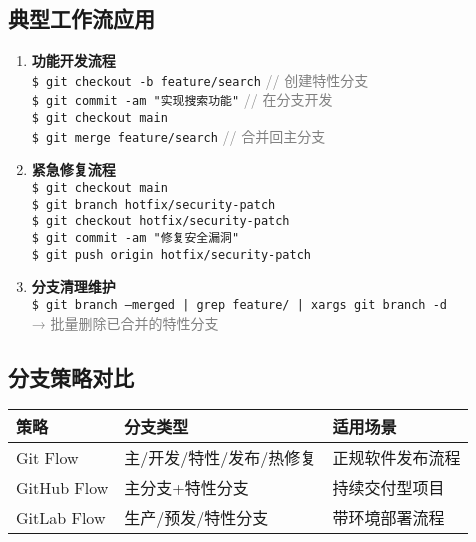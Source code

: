 \subsection{典型工作流应用}
\begin{enumerate}[leftmargin=*, nosep]
    \item \textbf{功能开发流程} \\
    \texttt{\$ git checkout -b feature/search} \quad \textcolor{gray}{// 创建特性分支} \\
    \texttt{\$ git commit -am "实现搜索功能"} \quad \textcolor{gray}{// 在分支开发} \\
    \texttt{\$ git checkout main} \\
    \texttt{\$ git merge feature/search} \quad \textcolor{gray}{// 合并回主分支}
    
    \item \textbf{紧急修复流程} \\
    \texttt{\$ git checkout main} \\
    \texttt{\$ git branch hotfix/security-patch} \\
    \texttt{\$ git checkout hotfix/security-patch} \\
    \texttt{\$ git commit -am "修复安全漏洞"} \\
    \texttt{\$ git push origin hotfix/security-patch}
    
    \item \textbf{分支清理维护} \\
    \texttt{\$ git branch --merged | grep feature/ | xargs git branch -d} \\
    \textcolor{gray}{→ 批量删除已合并的特性分支}
\end{enumerate}

\subsection{分支策略对比}
\begin{center}
\begin{tabular}{@{}lll@{}}
    \toprule
    \textbf{策略} & \textbf{分支类型} & \textbf{适用场景} \\
    \midrule
    Git Flow & 主/开发/特性/发布/热修复 & 正规软件发布流程 \\
    GitHub Flow & 主分支+特性分支 & 持续交付型项目 \\
    GitLab Flow & 生产/预发/特性分支 & 带环境部署流程 \\
    \bottomrule
\end{tabular}
\end{center}


